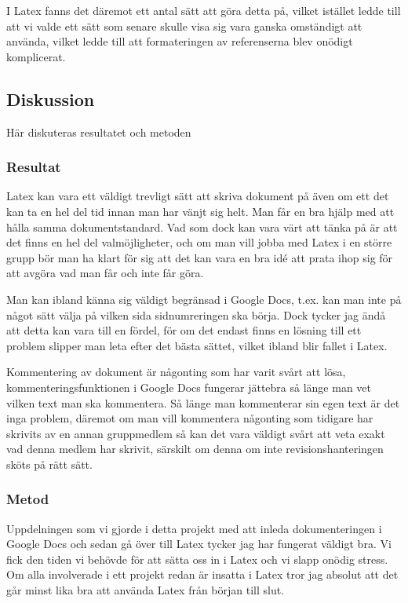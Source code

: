 I Latex fanns det däremot ett antal sätt att göra detta på, vilket istället ledde till att vi valde ett sätt som senare skulle visa sig vara ganska omständigt att använda, vilket ledde till att formateringen av referenserna blev onödigt komplicerat.

\subsection{Diskussion}
Här diskuteras resultatet och metoden

\subsubsection{Resultat}
Latex kan vara ett väldigt trevligt sätt att skriva dokument på även om ett det kan ta en hel del tid innan man har vänjt sig helt. Man får en bra hjälp med att hålla samma dokumentstandard. Vad som dock kan vara värt att tänka på är att det finns en hel del valmöjligheter, och om man vill jobba med Latex i en större grupp bör man ha klart för sig att det kan vara en bra idé att prata ihop sig för att avgöra vad man får och inte får göra.

Man kan ibland känna sig väldigt begränsad i Google Docs, t.ex. kan man inte på något sätt välja på vilken sida sidnumreringen ska börja. Dock tycker jag ändå att detta kan vara till en fördel, för om det endast finns en lösning till ett problem slipper man leta efter det bästa sättet, vilket ibland blir fallet i Latex.

Kommentering av dokument är någonting som har varit svårt att lösa, kommenteringsfunktionen i Google Docs fungerar jättebra så länge man vet vilken text man ska kommentera. Så länge man kommenterar sin egen text är det inga problem, däremot om man vill kommentera någonting som tidigare har skrivits av en annan gruppmedlem så kan det vara väldigt svårt att veta exakt vad denna medlem har skrivit, särskilt om denna om inte revisionshanteringen sköts på rätt sätt.

\subsubsection{Metod}
Uppdelningen som vi gjorde i detta projekt med att inleda dokumenteringen i Google Docs och sedan gå över till Latex tycker jag har fungerat väldigt bra. Vi fick den tiden vi behövde för att sätta oss in i Latex och vi slapp onödig stress. Om alla involverade i ett projekt redan är insatta i Latex tror jag absolut att det går minst lika bra att använda Latex från början till slut.

